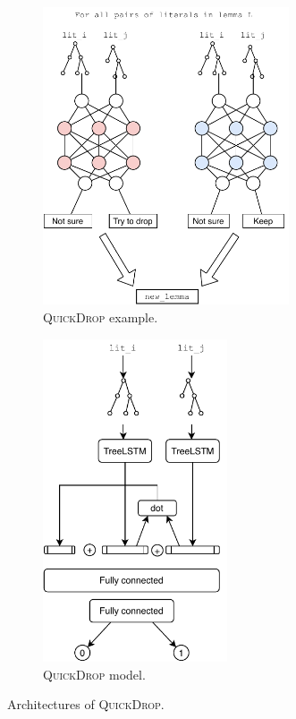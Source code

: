 \begin{figure}[t]
    \centering
        \begin{subfigure}[b]{0.45\textwidth}
    \centering
        \includegraphics[width=0.8\textwidth]{figures/doping-model_vertical.pdf}
        \caption{\textsc{QuickDrop} example.}
    	\label{fig:spc_model_details}
	\end{subfigure}
	\begin{subfigure}[b]{0.45\textwidth}
	\centering
        \includegraphics[width=0.6\textwidth]{figures/doping-model_detail.pdf}
        \caption{\textsc{QuickDrop} model.}
    	\label{subfig-4:model-detail}
	\end{subfigure}
    \caption{
      Architectures of \textsc{QuickDrop}.}
    \label{fig:architecture_of_qd}
\end{figure}

